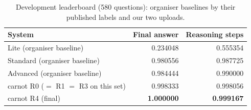 \begin{table}[t]
\caption{Development leaderboard (580 questions): organiser baselines by their published labels and our two uploads.}
\label{tab:baselines}
\centering
\scriptsize
\begin{tabular}{@{}lrr@{}}
\toprule
System & Final answer & Reasoning steps \\
\midrule
Lite (organiser baseline) & 0.234048 & 0.555354 \\
Standard (organiser baseline) & 0.980556 & 0.987725 \\
Advanced (organiser baseline) & 0.984444 & 0.990000 \\
carnot R0 ($=$ R1 $=$ R3 on this set) & 0.998333 & 0.998056 \\
carnot R4 (final) & \textbf{1.000000} & \textbf{0.999167} \\
\bottomrule
\end{tabular}
\end{table}
